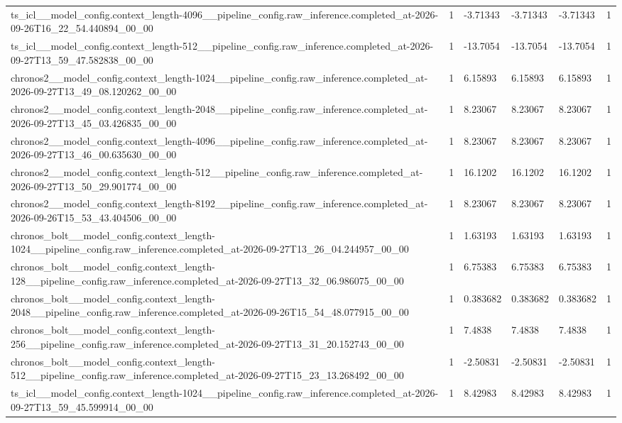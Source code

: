\begin{tabular}{llllll}
ts\_icl\_\_model\_config.context\_length-4096\_\_pipeline\_config.raw\_inference.completed\_at-2026-09-26T16\_22\_54.440894\_00\_00 & 1 & -3.71343 & -3.71343 & -3.71343 & 1 \\
ts\_icl\_\_model\_config.context\_length-512\_\_pipeline\_config.raw\_inference.completed\_at-2026-09-27T13\_59\_47.582838\_00\_00 & 1 & -13.7054 & -13.7054 & -13.7054 & 1 \\
chronos2\_\_model\_config.context\_length-1024\_\_pipeline\_config.raw\_inference.completed\_at-2026-09-27T13\_49\_08.120262\_00\_00 & 1 & 6.15893 & 6.15893 & 6.15893 & 1 \\
chronos2\_\_model\_config.context\_length-2048\_\_pipeline\_config.raw\_inference.completed\_at-2026-09-27T13\_45\_03.426835\_00\_00 & 1 & 8.23067 & 8.23067 & 8.23067 & 1 \\
chronos2\_\_model\_config.context\_length-4096\_\_pipeline\_config.raw\_inference.completed\_at-2026-09-27T13\_46\_00.635630\_00\_00 & 1 & 8.23067 & 8.23067 & 8.23067 & 1 \\
chronos2\_\_model\_config.context\_length-512\_\_pipeline\_config.raw\_inference.completed\_at-2026-09-27T13\_50\_29.901774\_00\_00 & 1 & 16.1202 & 16.1202 & 16.1202 & 1 \\
chronos2\_\_model\_config.context\_length-8192\_\_pipeline\_config.raw\_inference.completed\_at-2026-09-26T15\_53\_43.404506\_00\_00 & 1 & 8.23067 & 8.23067 & 8.23067 & 1 \\
chronos\_bolt\_\_model\_config.context\_length-1024\_\_pipeline\_config.raw\_inference.completed\_at-2026-09-27T13\_26\_04.244957\_00\_00 & 1 & 1.63193 & 1.63193 & 1.63193 & 1 \\
chronos\_bolt\_\_model\_config.context\_length-128\_\_pipeline\_config.raw\_inference.completed\_at-2026-09-27T13\_32\_06.986075\_00\_00 & 1 & 6.75383 & 6.75383 & 6.75383 & 1 \\
chronos\_bolt\_\_model\_config.context\_length-2048\_\_pipeline\_config.raw\_inference.completed\_at-2026-09-26T15\_54\_48.077915\_00\_00 & 1 & 0.383682 & 0.383682 & 0.383682 & 1 \\
chronos\_bolt\_\_model\_config.context\_length-256\_\_pipeline\_config.raw\_inference.completed\_at-2026-09-27T13\_31\_20.152743\_00\_00 & 1 & 7.4838 & 7.4838 & 7.4838 & 1 \\
chronos\_bolt\_\_model\_config.context\_length-512\_\_pipeline\_config.raw\_inference.completed\_at-2026-09-27T15\_23\_13.268492\_00\_00 & 1 & -2.50831 & -2.50831 & -2.50831 & 1 \\
ts\_icl\_\_model\_config.context\_length-1024\_\_pipeline\_config.raw\_inference.completed\_at-2026-09-27T13\_59\_45.599914\_00\_00 & 1 & 8.42983 & 8.42983 & 8.42983 & 1 \\

\end{tabular}
